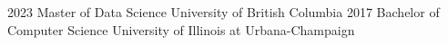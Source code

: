 \begin{experiences}

\degree
{2023}
{Master of Data Science}
{University of British Columbia}
\vspace{6pt}
\degree
{2017}
{Bachelor of Computer Science}
{University of Illinois at Urbana-Champaign}

\end{experiences}
